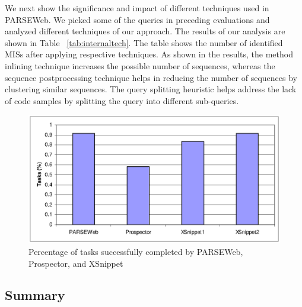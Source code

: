 \documentclass{fp035-thummalapenta}
\begin{document}
We next show the significance and impact of different techniques
used in PARSEWeb. We picked some of the queries in preceding
evaluations and analyzed different techniques of our approach. The
results of our analysis are shown in Table ~\ref{tab:internaltech}.
The table shows the number of identified MISs after applying respective
techniques.  As shown in the results, the method inlining technique
increases the possible number of sequences, whereas the sequence
postprocessing technique helps in reducing the number of sequences
by clustering similar sequences. The query splitting heuristic helps
address the lack of code samples by splitting the query into
different sub-queries.
\begin{figure}[t]
\centering
\includegraphics[scale=0.5,clip]{ComparisonResults.eps}\vspace*{-2ex}
\caption{Percentage of tasks successfully completed by PARSEWeb,
Prospector, and XSnippet} \label{fig:resultschart} \vspace*{-3ex}
\end{figure}
\subsection{Summary}
\end{document}
